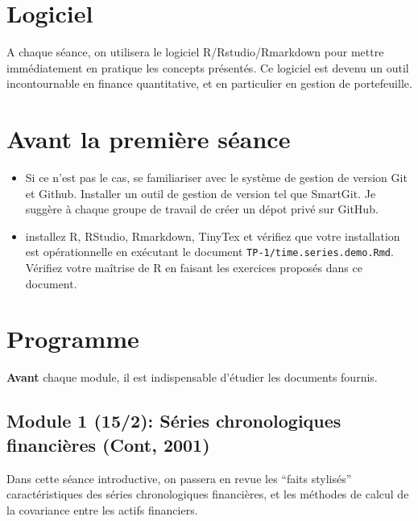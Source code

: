 \documentclass[
  11pt,
]{article}
\begin{document}
\hypertarget{logiciel}{%
\section{Logiciel}\label{logiciel}}

A chaque séance, on utilisera le logiciel R/Rstudio/Rmarkdown pour
mettre immédiatement en pratique les concepts présentés. Ce logiciel est
devenu un outil incontournable en finance quantitative, et en
particulier en gestion de portefeuille.

\hypertarget{avant-la-premiuxe8re-suxe9ance}{%
\section{Avant la première
séance}\label{avant-la-premiuxe8re-suxe9ance}}

\begin{itemize}
\item
  Si ce n'est pas le cas, se familiariser avec le système de gestion de
  version Git et Github. Installer un outil de gestion de version tel
  que SmartGit. Je suggère à chaque groupe de travail de créer un dépot
  privé sur GitHub.
\item
  installez R, RStudio, Rmarkdown, TinyTex et vérifiez que votre
  installation est opérationnelle en exécutant le document
  \texttt{TP-1/time.series.demo.Rmd}. Vérifiez votre maîtrise de R en
  faisant les exercices proposés dans ce document.
\end{itemize}

\hypertarget{programme}{%
\section{Programme}\label{programme}}

\textbf{Avant} chaque module, il est indispensable d'étudier les
documents fournis.

\hypertarget{module-1-152-suxe9ries-chronologiques-financiuxe8res-cont2001}{%
\subsection{Module 1 (15/2): Séries chronologiques financières (Cont,
2001)}\label{module-1-152-suxe9ries-chronologiques-financiuxe8res-cont2001}}

Dans cette séance introductive, on passera en revue les ``faits
stylisés'' caractéristiques des séries chronologiques financières, et
les méthodes de calcul de la covariance entre les actifs financiers.
\end{document}
